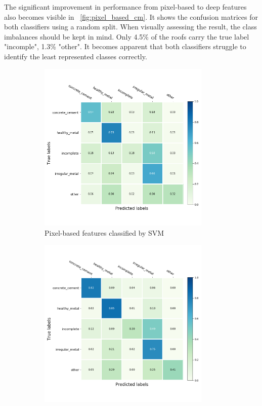 \documentclass[11pt]{article}
\begin{document}
	The significant improvement in performance from pixel-based to deep features also becomes visible in ~\ref{fig:pixel_based_cm}. It shows the confusion matrices for both classifiers using a random split. When visually assessing the result, the class imbalances should be kept in mind. Only 4.5\% of the roofs carry the true label "incomple", 1.3\% "other". It becomes apparent that both classifiers struggle to identify the least represented classes correctly.
	
	\begin{figure}
		\begin{subfigure}[t]{.5\textwidth}
			\centering
			\includegraphics[width=0.9\textwidth]{figures/results/pixel_based_cm.png}
			\caption{Pixel-based features classified by SVM}
		\end{subfigure}
		\begin{subfigure}[t]{.5\textwidth}
			\centering
			\includegraphics[width=0.9\textwidth]{figures/results/nn_based_cm.png}

\end{subfigure}
\end{figure}
\end{document}
